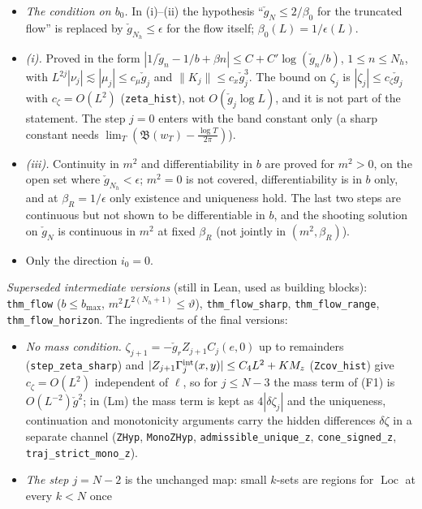 \documentclass[11pt]{amsart}
\theoremstyle{definition}
\theoremstyle{remark}
\numberwithin{equation}{section}
\newcommand{\Loc}{\operatorname{Loc}}
\begin{document}
\begin{itemize}
\begin{itemize}
    steps in $b$. The zero mode $tQ$ is left to Section~\ref{sec:corr}.
  \item \emph{The condition on $b_0$.} In (i)--(ii) the hypothesis ``$\check g_N\le2/\beta_0$ for the truncated
    flow'' is replaced by $\check g_{N_h}\le\epsilon$ for the flow itself; $\beta_0(L)=1/\epsilon(L)$.
  \item \emph{(i).} Proved in the form $|1/\check g_n-1/b+\beta n|\le C+C'\log(\check g_n/b)$, $1\le n\le N_h$,
    with $L^{2j}|\nu_j|\lesssim|\mu_j|\le c_\mu\check g_j$ and $\|K_j\|\le c_x\check g_j^3$. The bound on $\zeta_j$
    is $|\zeta_j|\le c_\zeta\check g_j$ with $c_\zeta=O(L^2)$ (\texttt{zeta\_hist}), not $O(\check g_j\log L)$, and it
    is not part of the statement. The step $j=0$ enters with the band constant only (a sharp constant needs
    $\lim_T(\mathfrak B(w_T)-\frac{\log T}{2\pi})$).
  \item \emph{(iii).} Continuity in $m^2$ and differentiability in $b$ are proved for $m^2>0$, on the open set
    where $\check g_{N_h}<\epsilon$; $m^2=0$ is not covered, differentiability is in $b$ only, and at
    $\beta_R=1/\epsilon$ only existence and uniqueness hold. The last two steps are continuous but not shown to be
    differentiable in $b$, and the shooting solution on $\check g_N$ is continuous in $m^2$ at fixed $\beta_R$
    (not jointly in $(m^2,\beta_R)$).
  \item Only the direction $i_0=0$.
  \end{itemize}
  \emph{Superseded intermediate versions} (still in Lean, used as building blocks): \texttt{thm\_flow}
  ($b\le b_{\max}$, $m^2L^{2(N_h+1)}\le\vartheta$), \texttt{thm\_flow\_sharp},
  \texttt{thm\_flow\_range}, \texttt{thm\_flow\_horizon}.
  The ingredients of the final versions:
  \begin{itemize}
  \item \emph{No mass condition.} $\zeta_{j+1}=-\check g_rZ_{j+1}C_j(e,0)$ up to remainders
    (\texttt{step\_zeta\_sharp}) and $|Z_{j+1}\Gamma^{\rm int}_j(x,y)|\le C_4L^2+KM_z$ (\texttt{Zcov\_hist}) give
    $c_\zeta=O(L^2)$ independent of $\ell$, so for $j\le N-3$ the mass term of (F1) is $O(L^{-2})\check g^2$; in (Lm)
    the mass term is kept as $4|\delta\zeta_j|$ and the uniqueness, continuation and monotonicity arguments carry
    the hidden differences $\delta\zeta$ in a separate channel (\texttt{ZHyp}, \texttt{MonoZHyp},
    \texttt{admissible\_unique\_z}, \texttt{cone\_signed\_z}, \texttt{traj\_strict\_mono\_z}).
  \item \emph{The step $j=N-2$} is the unchanged map: small $k$-sets are regions for $\Loc$ at every $k<N$ once

\end{itemize}
\end{itemize}
\end{document}
